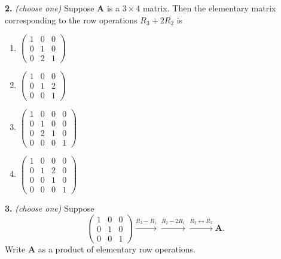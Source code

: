 \documentclass[10pt,a4paper]{article}
\begin{document}
\smallskip
\textbf{2.} \textit{(choose one)} Suppose \(\mathbf{A}\) is a \(3\times 4\) matrix. Then the elementary matrix corresponding to the row operations \(R_3+2R_2\) is

\begin{enumerate}[label=(\Alph*)]
\item \(\begin{pmatrix}1&0&0\\0&1&0\\0&2&1\end{pmatrix}\)
\item \(\begin{pmatrix}1&0&0\\0&1&2\\0&0&1\end{pmatrix}\)
\item \(\begin{pmatrix}1&0&0&0\\0&1&0&0\\0&2&1&0\\0&0&0&1\end{pmatrix}\)
\item \(\begin{pmatrix}1&0&0&0\\0&1&2&0\\0&0&1&0\\0&0&0&1\end{pmatrix}\)
\end{enumerate}
\smallskip
\textbf{3.} \textit{(choose one)} Suppose \[\left( \begin{array}{ccc} 1&0&0\\0&1&0\\0&0&1\end{array} \right)\xrightarrow{R_3- R_1}\xrightarrow{R_2-2R_1}\xrightarrow{R_2\leftrightarrow R_3}\mathbf{A}.\] Write \(\mathbf{A}\) as a product of elementary row operations.
\end{document}
